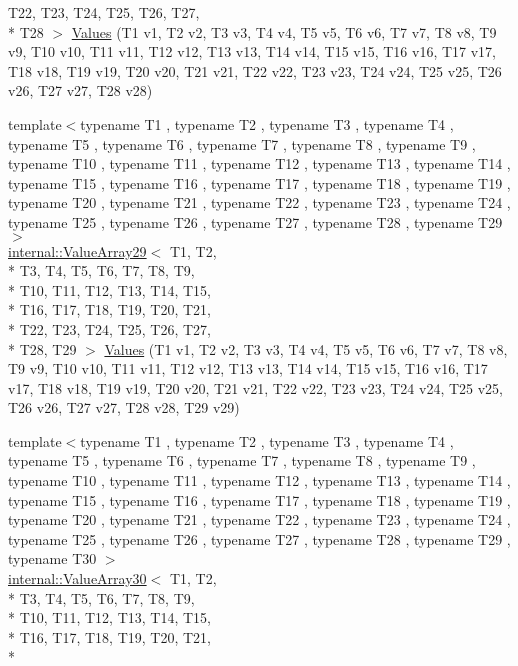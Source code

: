\begin{DoxyCompactItemize}
T22, T23, T24, T25, T26, T27, \\*
T28 $>$ \hyperlink{namespacetesting_a5785254e0510108d9d422e32ba18f170}{Values} (T1 v1, T2 v2, T3 v3, T4 v4, T5 v5, T6 v6, T7 v7, T8 v8, T9 v9, T10 v10, T11 v11, T12 v12, T13 v13, T14 v14, T15 v15, T16 v16, T17 v17, T18 v18, T19 v19, T20 v20, T21 v21, T22 v22, T23 v23, T24 v24, T25 v25, T26 v26, T27 v27, T28 v28)
\item 
{\footnotesize template$<$typename T1 , typename T2 , typename T3 , typename T4 , typename T5 , typename T6 , typename T7 , typename T8 , typename T9 , typename T10 , typename T11 , typename T12 , typename T13 , typename T14 , typename T15 , typename T16 , typename T17 , typename T18 , typename T19 , typename T20 , typename T21 , typename T22 , typename T23 , typename T24 , typename T25 , typename T26 , typename T27 , typename T28 , typename T29 $>$ }\\\hyperlink{classtesting_1_1internal_1_1_value_array29}{internal\-::\-Value\-Array29}$<$ T1, T2, \\*
T3, T4, T5, T6, T7, T8, T9, \\*
T10, T11, T12, T13, T14, T15, \\*
T16, T17, T18, T19, T20, T21, \\*
T22, T23, T24, T25, T26, T27, \\*
T28, T29 $>$ \hyperlink{namespacetesting_a3d8a9bd3f027d89ff2873e3f0ff396cb}{Values} (T1 v1, T2 v2, T3 v3, T4 v4, T5 v5, T6 v6, T7 v7, T8 v8, T9 v9, T10 v10, T11 v11, T12 v12, T13 v13, T14 v14, T15 v15, T16 v16, T17 v17, T18 v18, T19 v19, T20 v20, T21 v21, T22 v22, T23 v23, T24 v24, T25 v25, T26 v26, T27 v27, T28 v28, T29 v29)
\item 
{\footnotesize template$<$typename T1 , typename T2 , typename T3 , typename T4 , typename T5 , typename T6 , typename T7 , typename T8 , typename T9 , typename T10 , typename T11 , typename T12 , typename T13 , typename T14 , typename T15 , typename T16 , typename T17 , typename T18 , typename T19 , typename T20 , typename T21 , typename T22 , typename T23 , typename T24 , typename T25 , typename T26 , typename T27 , typename T28 , typename T29 , typename T30 $>$ }\\\hyperlink{classtesting_1_1internal_1_1_value_array30}{internal\-::\-Value\-Array30}$<$ T1, T2, \\*
T3, T4, T5, T6, T7, T8, T9, \\*
T10, T11, T12, T13, T14, T15, \\*
T16, T17, T18, T19, T20, T21, \\*

\end{DoxyCompactItemize}
